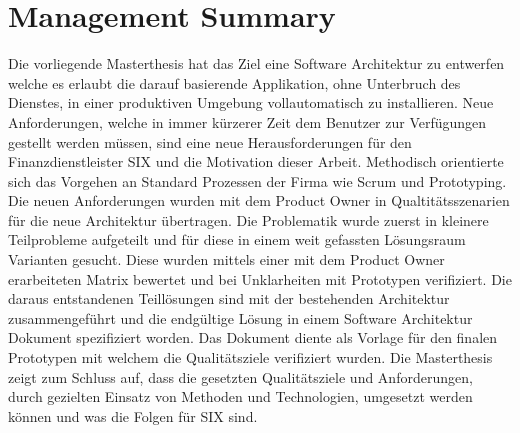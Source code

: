 \chapter{Management Summary}

Die vorliegende Masterthesis hat das Ziel eine Software Architektur zu entwerfen welche es erlaubt die darauf basierende Applikation, ohne Unterbruch des Dienstes, in einer produktiven Umgebung vollautomatisch zu installieren.\newline\newline
Neue Anforderungen, welche in immer kürzerer Zeit dem Benutzer zur Verfügungen gestellt werden müssen, sind eine neue Herausforderungen für den Finanzdienstleister SIX und die Motivation dieser Arbeit.\newline\newline
Methodisch orientierte sich das Vorgehen an Standard Prozessen der Firma wie Scrum und Prototyping. Die neuen Anforderungen wurden mit dem Product Owner in Qualtitätsszenarien für die neue Architektur übertragen. Die Problematik wurde zuerst in kleinere Teilprobleme aufgeteilt und für diese in einem weit gefassten Lösungsraum Varianten gesucht. Diese wurden mittels einer mit dem Product Owner erarbeiteten Matrix bewertet und bei Unklarheiten mit Prototypen verifiziert. Die daraus entstandenen Teillösungen sind mit der bestehenden Architektur zusammengeführt und die endgültige Lösung in einem Software Architektur Dokument spezifiziert worden. Das Dokument diente als Vorlage für den finalen Prototypen mit welchem die Qualitätsziele verifiziert wurden.\newline\newline
Die Masterthesis zeigt zum Schluss auf, dass die gesetzten Qualitätsziele und Anforderungen, durch gezielten Einsatz von Methoden und Technologien, umgesetzt werden können und was die Folgen für SIX sind.